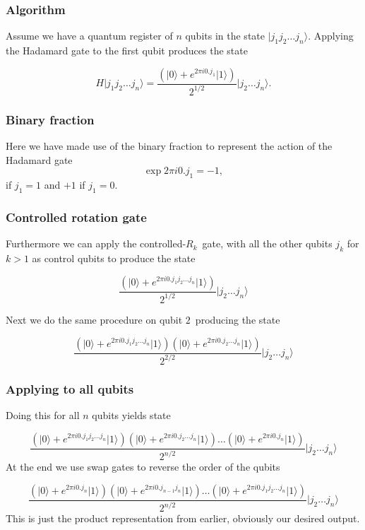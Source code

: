 \documentclass{beamer}
\begin{document}
\begin{frame}
\frametitle{Algorithm}

Assume we have a quantum register of $n$ qubits in the state $\vert j_1 j_2 \dots j_n\rangle$.
Applying the Hadamard gate to the first qubit
produces the state

\[
H\vert j_1 j_2 \dots j_n\rangle = \frac{\left(\vert 0 \rangle + e^{2\pi i 0.j_1}\vert 1\rangle\right)}{2^{1/2}} \vert j_2 \dots j_n\rangle.
\]
\end{frame}

\begin{frame}
\frametitle{Binary fraction}

Here we have made use of the binary fraction to represent the action of the Hadamard gate 
\[
\exp{2\pi i 0.j_1} = -1,
\]
if $j_1 = 1$ and $+1$ if $j_1 = 0$.
\end{frame}

\begin{frame}
\frametitle{Controlled rotation gate}

Furthermore we can apply the controlled-$R_k$ gate, with all the other qubits $j_k$ for $k>1$ as control qubits to produce the state

\[
\frac{\left(\vert 0 \rangle + e^{2\pi i 0.j_1j_2\dots j_n}\vert 1\rangle\right)}{2^{1/2}} \vert j_2 \dots j_n\rangle
\]

Next we do the same procedure on qubit $2$ producing the state

\[
\frac{\left(\vert 0 \rangle + e^{2\pi i 0.j_1j_2\dots j_n}\vert 1\rangle\right)\left(\vert 0 \rangle + e^{2\pi i 0.j_2\dots j_n}\vert 1\rangle\right)}{2^{2/2}} \vert j_2 \dots j_n\rangle
\]
\end{frame}

\begin{frame}
\frametitle{Applying to all qubits}

Doing this for all $n$ qubits yields state

\[
\frac{\left(\vert 0 \rangle + e^{2\pi i 0.j_1j_2\dots j_n}\vert 1\rangle\right)\left(\vert 0 \rangle + e^{2\pi i 0.j_2\dots j_n}\vert 1\rangle\right)\dots \left(\vert 0 \rangle + e^{2\pi i 0.j_n}\vert 1\rangle\right)}{2^{n/2}} \vert j_2 \dots j_n\rangle
\]
At the end we use swap gates to reverse the order of the qubits

\[
\frac{\left(\vert 0 \rangle + e^{2\pi i 0.j_n}\vert 1\rangle\right)\left(\vert 0 \rangle + e^{2\pi i 0.j_{n-1}j_n}\vert 1\rangle\right)\dots\left(\vert 0 \rangle + e^{2\pi i 0.j_1j_2\dots j_n}\vert 1\rangle\right) }{2^{n/2}} \vert j_2 \dots j_n\rangle
\]
This is just the product representation from earlier, obviously our desired output.
\end{frame}
\end{document}
